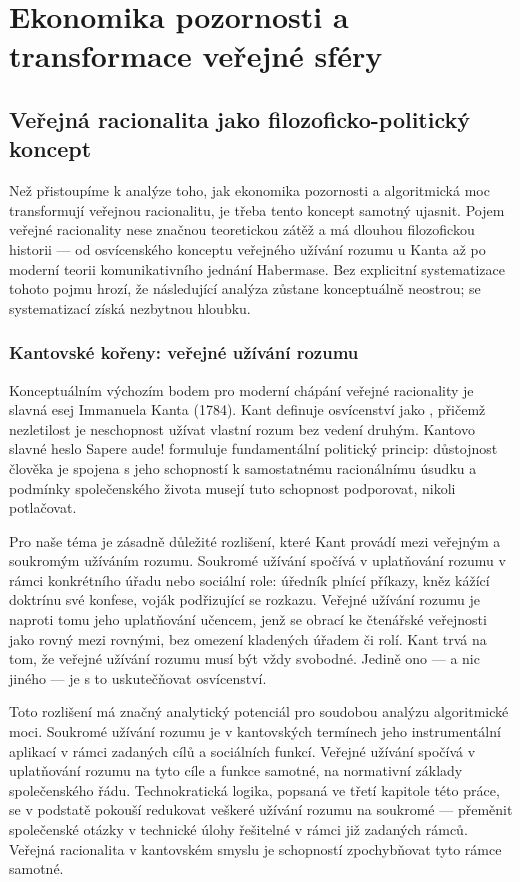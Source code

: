 \chapter{Ekonomika pozornosti a transformace veřejné sféry}
\section{Veřejná racionalita jako filozoficko-politický koncept}
Než přistoupíme k analýze toho, jak ekonomika pozornosti a algoritmická moc transformují veřejnou racionalitu, je třeba tento koncept samotný ujasnit. Pojem veřejné racionality nese značnou teoretickou zátěž a má dlouhou filozofickou historii — od osvícenského konceptu veřejného užívání rozumu u Kanta až po moderní teorii komunikativního jednání Habermase. Bez explicitní systematizace tohoto pojmu hrozí, že následující analýza zůstane konceptuálně neostrou; se systematizací získá nezbytnou hloubku.

\subsection{Kantovské kořeny: veřejné užívání rozumu}

Konceptuálním výchozím bodem pro moderní chápání veřejné racionality je slavná esej Immanuela Kanta  (1784). Kant definuje osvícenství jako , přičemž nezletilost je neschopnost užívat vlastní rozum bez vedení druhým. Kantovo slavné heslo Sapere aude!  formuluje fundamentální politický princip: důstojnost člověka je spojena s jeho schopností k samostatnému racionálnímu úsudku a podmínky společenského života musejí tuto schopnost podporovat, nikoli potlačovat.

Pro naše téma je zásadně důležité rozlišení, které Kant provádí mezi veřejným a soukromým užíváním rozumu. Soukromé užívání spočívá v uplatňování rozumu v rámci konkrétního úřadu nebo sociální role: úředník plnící příkazy, kněz kážící doktrínu své konfese, voják podřizující se rozkazu. Veřejné užívání rozumu je naproti tomu jeho uplatňování učencem, jenž se obrací ke čtenářské veřejnosti jako rovný mezi rovnými, bez omezení kladených úřadem či rolí. Kant trvá na tom, že veřejné užívání rozumu musí být vždy svobodné. Jedině ono — a nic jiného — je s to uskutečňovat osvícenství.

Toto rozlišení má značný analytický potenciál pro soudobou analýzu algoritmické moci. Soukromé užívání rozumu je v kantovských termínech jeho instrumentální aplikací v rámci zadaných cílů a sociálních funkcí. Veřejné užívání spočívá v uplatňování rozumu na tyto cíle a funkce samotné, na normativní základy společenského řádu. Technokratická logika, popsaná ve třetí kapitole této práce, se v podstatě pokouší redukovat veškeré užívání rozumu na soukromé — přeměnit společenské otázky v technické úlohy řešitelné v rámci již zadaných rámců. Veřejná racionalita v kantovském smyslu je schopností zpochybňovat tyto rámce samotné.

